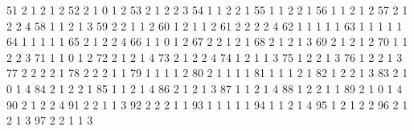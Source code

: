 \documentclass[
  letterpaper,
  DIV=11,
  numbers=noendperiod]{scrreprt}
\newenvironment{Shaded}{\begin{snugshade}}{\end{snugshade}}
\newcommand{\NormalTok}[1]{\textcolor[rgb]{0.00,0.23,0.31}{#1}}
\begin{document}
\begin{Shaded}
\begin{Highlighting}[]
\NormalTok{51          2         1     2    1        2}
\NormalTok{52          2         1     0    1        2}
\NormalTok{53          2         1     2    2        3}
\NormalTok{54          1         1     2    2        1}
\NormalTok{55          1         1     2    2        1}
\NormalTok{56          1         1     2    1        2}
\NormalTok{57          2         1     2    2        4}
\NormalTok{58          1         1     2    1        3}
\NormalTok{59          2         2     1    1        2}
\NormalTok{60          1         2     1    1        2}
\NormalTok{61          2         2     2    2        4}
\NormalTok{62          1         1     1    1        1}
\NormalTok{63          1         1     1    1        1}
\NormalTok{64          1         1     1    1        1}
\NormalTok{65          2         1     2    2        4}
\NormalTok{66          1         1     0    1        2}
\NormalTok{67          2         2     1    2        1}
\NormalTok{68          2         1     2    1        3}
\NormalTok{69          2         1     2    1        2}
\NormalTok{70          1         1     2    2        3}
\NormalTok{71          1         1     0    1        2}
\NormalTok{72          2         1     2    1        4}
\NormalTok{73          2         1     2    2        4}
\NormalTok{74          1         2     1    1        3}
\NormalTok{75          1         2     2    1        3}
\NormalTok{76          1         2     2    1        3}
\NormalTok{77          2         2     2    2        1}
\NormalTok{78          2         2     2    1        1}
\NormalTok{79          1         1     1    1        2}
\NormalTok{80          2         1     1    1        1}
\NormalTok{81          1         1     1    2        1}
\NormalTok{82          1         2     2    1        3}
\NormalTok{83          2         1     0    1        4}
\NormalTok{84          2         1     2    2        1}
\NormalTok{85          1         1     2    1        4}
\NormalTok{86          2         1     2    1        3}
\NormalTok{87          1         1     2    1        4}
\NormalTok{88          1         2     2    1        1}
\NormalTok{89          2         1     0    1        4}
\NormalTok{90          2         1     2    2        4}
\NormalTok{91          2         2     1    1        3}
\NormalTok{92          2         2     2    1        1}
\NormalTok{93          1         1     1    1        1}
\NormalTok{94          1         1     2    1        4}
\NormalTok{95          1         2     1    2        2}
\NormalTok{96          2         1     2    1        3}
\NormalTok{97          2         2     1    1        3}

\end{Highlighting}
\end{Shaded}
\end{document}
